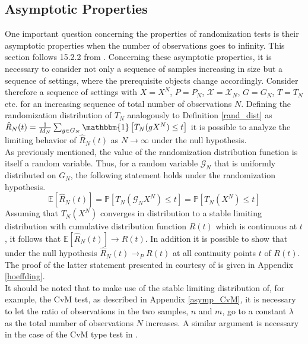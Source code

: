 \documentclass[12pt, a4paper]{article}
\theoremstyle{MAstyle} \newtheorem{assumption}{Assumption}[section]
\theoremstyle{MAstyle} \newtheorem{definition}{Definition}[section]
\theoremstyle{MAstyle} \newtheorem{theorem}{Theorem}[section]
\begin{document}
	
		
		\subsection{Asymptotic Properties}\label{perm_asymp}
			One important question concerning the properties of randomization tests is their asymptotic properties when the number of observations goes to infinity. This section follows 15.2.2 from \cite{lehmann_testing_2005}. Concerning these asymptotic properties, it is necessary to consider not only a sequence of samples increasing in size but a sequence of settings, where the prerequisite objects change accordingly. Consider therefore a sequence of settings with $X = X^N$, $P = P_N$, $\mathcal{X} = \mathcal{X}_N$, $G = G_N$, $T = T_N$ etc. for an increasing sequence of total number of observations $N$.
			Defining the randomization distribution of $T_N$ analogously to Definition \ref{rand_dist} as $\hat{R}_N(t) = \frac{1}{M_N} \sum_{g \in G_N} \mathbbm{1} \left[T_N(gX^N) \leq t\right]$ it is possible to analyze the limiting behavior of $\hat{R}_N(t)$ as $N \rightarrow \infty$ under the null hypothesis.\\
			As previously mentioned, the value of the randomization distribution function is itself a random variable. Thus, for a random variable $\mathcal{G}_N$ that is uniformly distributed on $G_N$, the following statement holds under the randomization hypothesis.
			\begin{equation}
				\mathbb{E}[\hat{R}_N(t)] = \mathbb{P}\left[T_N(\mathcal{G}_NX^N) \leq t\right] = \mathbb{P}\left[T_N(X^N) \leq t\right]
			\end{equation}
			Assuming that $T_N(X^N)$ converges in distribution to a stable limiting distribution with cumulative distribution function $R(t)$ which is continuous at $t$, it follows that $\mathbb{E}[\hat{R}_N(t)] \rightarrow R(t)$. In addition it is possible to show that under the null hypothesis $\hat{R}_N(t) \rightarrow_P R(t)$ at all continuity points $t$ of $R(t)$. The proof of the latter statement presented in \cite{lehmann_testing_2005} courtesy of \cite{hoeffding_large-sample_1952} is given in Appendix \ref{hoeffding}.\\
			
			It should be noted that to make use of the stable limiting distribution of, for example, the CvM test, as described in Appendix \ref{asymp_CvM}, it is necessary to let the ratio of observations in the two samples, $n$ and $m$, go to a constant $\lambda$ as the total number of observations $N$ increases. A similar argument is necessary in the case of the CvM type test in \cite{bugni_permutation_2021}.
		
\end{document}
